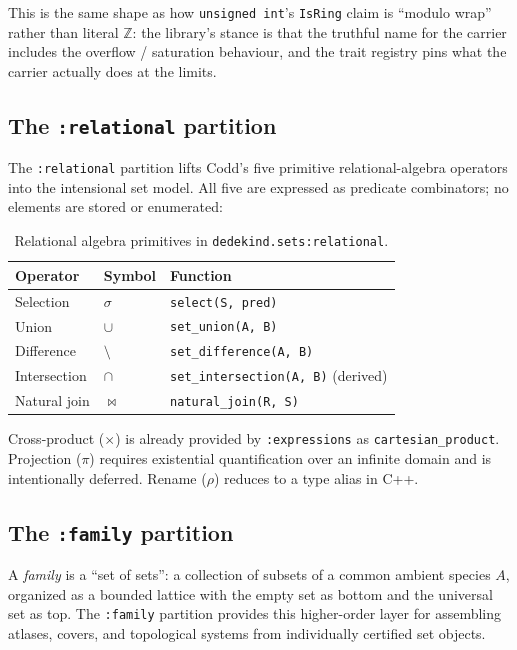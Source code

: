 \documentclass[11pt, a4paper]{report}
\begin{document}
This is the same shape as how \texttt{unsigned int}'s \texttt{IsRing} claim is ``modulo wrap'' rather than literal $\mathbb{Z}$: the library's stance is that the truthful name for the carrier includes the overflow / saturation behaviour, and the trait registry pins what the carrier actually does at the limits.

\subsection{The \texttt{:relational} partition}
\label{sec:sets-relational}

The \texttt{:relational} partition lifts Codd's five primitive relational-algebra operators into the intensional set model. All five are expressed as predicate combinators; no elements are stored or enumerated:

\begin{table}[ht]
\centering
\caption{Relational algebra primitives in \texttt{dedekind.sets:relational}.}
\label{table:relational}
\begin{tabular}{lll}
\toprule
\textbf{Operator} & \textbf{Symbol} & \textbf{Function} \\
\midrule
Selection & $\sigma$ & \texttt{select(S, pred)} \\
Union & $\cup$ & \texttt{set\_union(A, B)} \\
Difference & $\setminus$ & \texttt{set\_difference(A, B)} \\
Intersection & $\cap$ & \texttt{set\_intersection(A, B)} (derived) \\
Natural join & $\bowtie$ & \texttt{natural\_join(R, S)} \\
\bottomrule
\end{tabular}
\end{table}

Cross-product ($\times$) is already provided by \texttt{:expressions} as \texttt{cartesian\_product}.
Projection ($\pi$) requires existential quantification over an infinite domain and is intentionally deferred. Rename ($\rho$) reduces to a type alias in C++.

\subsection{The \texttt{:family} partition}
\label{sec:sets-family}

A \emph{family} is a ``set of sets'': a collection of subsets of a common ambient species $A$, organized as a bounded lattice with the empty set as bottom and the universal set as top. The \texttt{:family} partition provides this higher-order layer for assembling atlases, covers, and topological systems from individually certified set objects.
\end{document}
